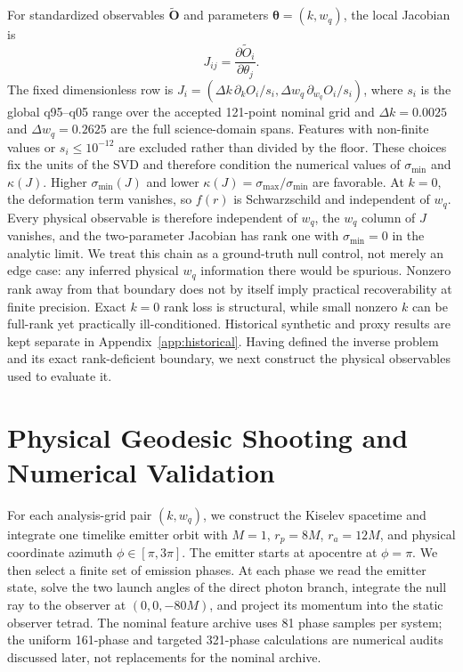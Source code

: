 \documentclass[11pt]{article}
\newcommand{\wq}{w_q}
\newcommand{\smin}{\sigma_{\min}}
\newcommand{\kappaJ}{\kappa(J)}
\begin{document}
For standardized observables $\tilde{\mathbf O}$ and parameters
$\boldsymbol\theta=(k,\wq)$, the local Jacobian is
\begin{equation}
 J_{ij}=\frac{\partial\tilde O_i}{\partial\theta_j}.
\end{equation}
The fixed dimensionless row is
$J_i=(\Delta k\,\partial_k O_i/s_i,
\Delta\wq\,\partial_{\wq}O_i/s_i)$, where $s_i$ is the global q95--q05
range over the accepted 121-point nominal grid and $\Delta k=0.0025$ and
$\Delta\wq=0.2625$ are the full science-domain spans. Features with non-finite
values or $s_i\leq10^{-12}$ are excluded rather than divided by the floor.
These choices fix the units of the SVD and therefore condition the numerical
values of $\smin$ and $\kappaJ$.
Higher $\smin(J)$ and lower $\kappaJ=\sigma_{\max}/\smin$ are favorable. At
$k=0$, the deformation term vanishes, so $f(r)$ is Schwarzschild and independent
of $\wq$. Every physical observable is therefore independent of $\wq$, the
$\wq$ column of $J$ vanishes, and the two-parameter Jacobian has rank one with
$\smin=0$ in the analytic limit. We treat this chain as a ground-truth null
control, not merely an edge case: any inferred physical $\wq$ information there
would be spurious. Nonzero rank away from that boundary does not by itself
imply practical recoverability at finite precision. Exact $k=0$ rank loss is
structural, while small nonzero $k$ can be full-rank yet practically
ill-conditioned.
Historical synthetic and proxy results are kept separate in
Appendix~\ref{app:historical}. Having defined the inverse problem and its exact
rank-deficient boundary, we next construct the physical observables used to
evaluate it.

\section{Physical Geodesic Shooting and Numerical Validation}
For each analysis-grid pair $(k,\wq)$, we construct the Kiselev spacetime and
integrate one timelike emitter orbit with $M=1$, $r_p=8M$, $r_a=12M$, and
physical coordinate azimuth $\phi\in[\pi,3\pi]$. The emitter starts at
apocentre at $\phi=\pi$. We then select a finite set of emission phases. At
each phase we read the emitter state, solve the two launch angles of the direct
photon branch, integrate the null ray to the observer at $(0,0,-80M)$, and
project its momentum into the static observer tetrad. The nominal feature
archive uses 81 phase samples per system; the uniform 161-phase and targeted
321-phase calculations are numerical audits discussed later, not replacements
for the nominal archive.
\end{document}

